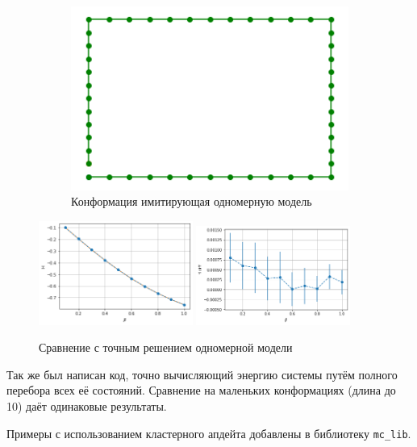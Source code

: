 \begin{figure}[H]
	\centering
	\begin{subfigure}[t]{0.45\textwidth}
		\includegraphics[width = \textwidth]{../images/1D_conf.png} 
		\caption{Конформация имитирующая одномерную модель}
	\end{subfigure}
	\includegraphics[width = 0.45\textwidth]{../images/1D_ene.png}
	\includegraphics[width = 0.45\textwidth]{../images/1D_ene_diff.png} 
	\caption{Сравнение с точным решением одномерной модели}
\end{figure}

Так же был написан код, точно вычисляющий энергию системы путём полного перебора всех её состояний. Сравнение на маленьких конформациях (длина до 10) даёт одинаковые результаты.



Примеры с использованием кластерного апдейта добавлены в библиотеку \texttt{mc\_lib}.